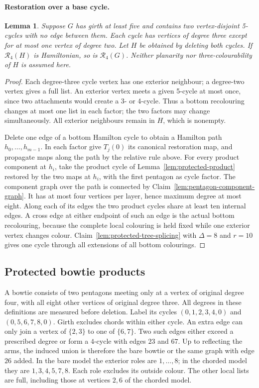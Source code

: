 \documentclass[11pt]{article}
\newtheorem{lemma}[theorem]{Lemma}
\theoremstyle{remark}
\newcommand{\R}{\mathcal R}
\numberwithin{equation}{section}
\numberwithin{table}{section}
\begin{document}
\paragraph{Restoration over a base cycle.}
\begin{lemma}\label{lem:two-pentagons-restore}
Suppose $G$ has girth at least five and contains two vertex-disjoint
5-cycles with no edge between them. Each cycle has vertices of degree
three except for at most one vertex of degree two.
Let $H$ be obtained by deleting both cycles. If $\R_4(H)$ is
Hamiltonian, so is $\R_4(G)$.
Neither planarity nor three-colourability of $H$ is assumed here.
\end{lemma}
\begin{proof}
Each degree-three cycle vertex has one exterior neighbour; a
degree-two vertex gives a full list. An exterior vertex meets a
given 5-cycle at most once, since two attachments would create a
3- or 4-cycle. Thus a bottom recolouring changes at most one list
in each factor; the two factors may change simultaneously.
All exterior neighbours remain in $H$, which is nonempty.

Delete one edge of a bottom Hamilton cycle to obtain a Hamilton path
$h_0,\ldots,h_{m-1}$. In each factor give $T_j(0)$ its canonical
restoration map, and propagate maps along the path by the relative
rule above. For every product component at $h_i$, take the product
cycle of Lemma~\ref{lem:protected-product} restored by the two maps
at $h_i$, with the first pentagon as cycle factor. The component graph
over the path is connected by Claim~\ref{lem:pentagon-component-graph}.
It has at most four vertices per layer, hence maximum degree at most
eight. Along each of its edges the two product cycles share at least
ten internal edges. A cross edge at either endpoint of such an edge is
the actual bottom recolouring, because the complete local colouring is
held fixed while one exterior vertex changes colour.
Claim~\ref{lem:protected-tree-splicing} with $\Delta=8$ and $r=10$
gives one cycle through all extensions of all bottom colourings.
\end{proof}


\subsection{Protected bowtie products}
A bowtie consists of two pentagons meeting only at a vertex of original degree four,
with all eight other vertices of original degree three. All degrees in
these definitions are measured before deletion.
Label its cycles $(0,1,2,3,4,0)$ and $(0,5,6,7,8,0)$. Girth excludes
chords within either cycle. An extra edge can only join a vertex of
$\{2,3\}$ to one of $\{6,7\}$. Two such edges either exceed a prescribed
degree or form a $4$-cycle with edges $23$ and $67$. Up to reflecting the
arms, the induced union is therefore the bare bowtie or the same graph
with edge $26$ added. In the bare model the exterior roles are
$1,\ldots,8$; in the chorded model they are $1,3,4,5,7,8$. Each role
excludes its outside colour. The other local lists are full, including
those at vertices $2,6$ of the chorded model.
\end{document}
